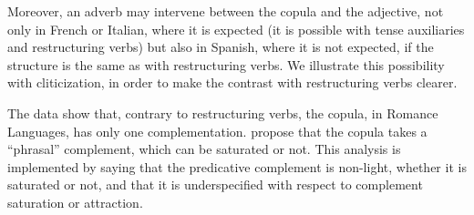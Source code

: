 \documentclass[output=paper
                ,modfonts
                ,nonflat
	        ,collection
	        ,collectionchapter
	        ,collectiontoclongg
 	        ,biblatex
                ,babelshorthands
                ,newtxmath
                ,draftmode
                ,colorlinks, citecolor=brown
]{./langsci/langscibook}
\begin{document}
{\begin{exe}
\begin{xlist}
	\label{GSexemple33c} 
	\end{xlist}
\end{exe}

Moreover, an adverb may intervene between the copula and the adjective, not only in French or Italian, where it is expected (it is possible with tense auxiliaries and restructuring verbs) but also in Spanish, where it is not expected, if the structure is the same as with restructuring verbs. We illustrate this possibility with cliticization, in order to make the contrast with restructuring verbs clearer.

\eal
	\label{GSexemple34} 
	\label{GSexemple34a}

	\label{GSexemple34b}
		
	\label{GSexemple34c}
\zl

The data show that, contrary to restructuring verbs, the copula, in Romance Languages, has only one complementation. \citet{AG2002b-u,AG2010} propose that the copula takes a ``phrasal'' complement, which can be saturated or not. This analysis is implemented by saying that the predicative complement is non-light, whether it is saturated or not, and that it is underspecified with respect to complement saturation or attraction.

\begin{exe}
        \label{GSexemple35}
\end{exe}

}
\end{document}
